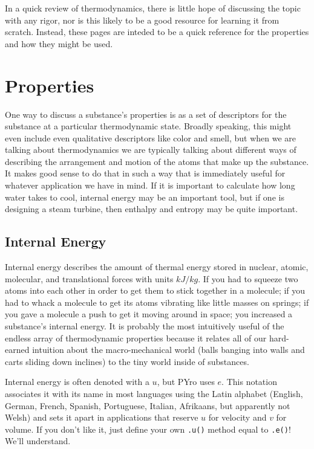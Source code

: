 In a quick review of thermodynamics, there is little hope of discussing the topic with any rigor, nor is this likely to be a good resource for learning it from scratch.  Instead, these pages are inteded to be a quick reference for the properties and how they might be used.

\section{Properties}
One way to discuss a substance's properties is as a set of descriptors for the substance at a particular thermodynamic state.  Broadly speaking, this might even include even qualitative descriptors like color and smell, but when we are talking about thermodynamics we are typically talking about different ways of describing the arrangement and motion of the atoms that make up the substance.  It makes good sense to do that in such a way that is immediately useful for whatever application we have in mind.  If it is important to calculate how long water takes to cool, internal energy may be an important tool, but if one is designing a steam turbine, then enthalpy and entropy may be quite important.

\subsection{Internal Energy}
Internal energy describes the amount of thermal energy stored in nuclear, atomic, molecular, and translational forces with units $kJ/kg$.  If you had to squeeze two atoms into each other in order to get them to stick together in a molecule; if you had to whack a molecule to get its atoms vibrating like little masses on springs; if you gave a molecule a push to get it moving around in space; you increased a substance's internal energy.  It is probably the most intuitively useful of the endless array of thermodynamic properties because it relates all of our hard-earned intuition about the macro-mechanical world (balls banging into walls and carts sliding down inclines) to the tiny world inside of substances.

Internal energy is often denoted with a $u$, but PYro uses $e$.  This notation associates it with its name in most languages using the Latin alphabet (English, German, French, Spanish, Portuguese, Italian, Afrikaans, but apparently not Welsh) and sets it apart in applications that reserve $u$ for velocity and $v$ for volume.  If you don't like it, just define your own \verb|.u()| method equal to \verb|.e()|!  We'll understand.

